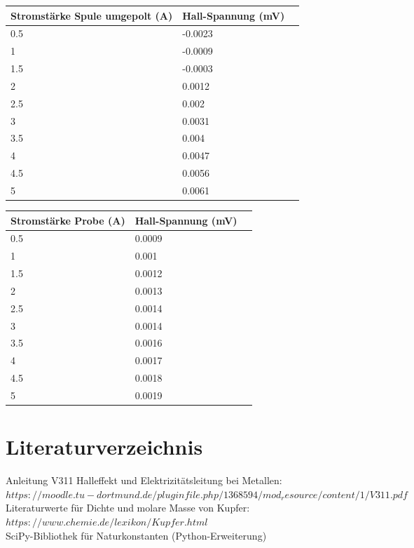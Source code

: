 \documentclass[titlepage=firstcover, captions=tableheading]{scrartcl}
\begin{document}
\begin{center}
    \begin{tabular}{lll}
        \toprule
        Stromstärke Spule umgepolt (A) & Hall-Spannung (mV) \\
        \midrule 
          0.5      &  -0.0023\\
          1        &  -0.0009\\
          1.5      &  -0.0003\\ 
          2        &  0.0012\\ 
          2.5      &  0.002\\ 
          3        &  0.0031\\ 
          3.5      &  0.004\\ 
          4        &  0.0047\\ 
          4.5      &  0.0056\\ 
          5        &  0.0061 \\ 
        \bottomrule
    \end{tabular}
\end{center}

\begin{center}
    \begin{tabular}{lll}
        \toprule
        Stromstärke Probe (A) & Hall-Spannung (mV) \\
        \midrule 
          0.5      & 0.0009 \\
          1        & 0.001 \\
          1.5      & 0.0012 \\ 
          2        & 0.0013 \\ 
          2.5      & 0.0014\\  
          3        & 0.0014 \\ 
          3.5      & 0.0016 \\ 
          4        & 0.0017 \\ 
          4.5      & 0.0018 \\ 
          5        & 0.0019 \\ 
        \bottomrule
    \end{tabular}
\end{center}

\section{Literaturverzeichnis}
Anleitung V311 Halleffekt und Elektrizitätsleitung bei Metallen: $https://moodle.tu-dortmund.de/pluginfile.php/1368594/mod_resource/content/1/V311.pdf$\\
Literaturwerte für Dichte und molare Masse von Kupfer: $https://www.chemie.de/lexikon/Kupfer.html$\\
SciPy-Bibliothek für Naturkonstanten (Python-Erweiterung)
\end{document}
